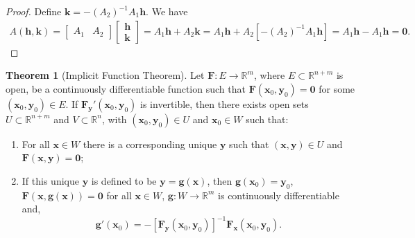 \documentclass{article}
\newcommand{\R}{\mathbb{R}}
\newcommand{\x}{\mathbf{x}}
\newcommand{\y}{\mathbf{y}}
\newcommand{\h}{\mathbf{h}}
\newcommand{\g}{\mathbf{g}}
\newcommand{\ze}{\mathbf{0}}
\theoremstyle{definition}
\newtheorem{theorem}{Theorem}[section]
\begin{document}
	\begin{proof}
		Define $ \mathbf k = -(A_2)^{-1}A_1 \h$. We have 
		\begin{align*}
			A(\h,\mathbf k) = \begin{bmatrix}A_1&A_2\end{bmatrix}\begin{bmatrix}
				\mathbf h\\ \mathbf k
			\end{bmatrix} = A_1\h + A_2\mathbf k = A_1\h + A_2[-(A_2)^{-1}A_1 \h] = A_1\h - A_1\h = \ze.
		\end{align*} 
	\end{proof}
	\begin{theorem}[Implicit Function Theorem]
		Let $ \mathbf F:E\to \R^{m} $, where $ E\subset  \R^{n+m}$ is open, be a continuously differentiable function such that $ \mathbf F(\x_0,\y_0) =\ze $ for some $ (\x_0,\y_0)\in E $. If $ \mathbf F_\y'(\x_0,\y_0) $ is invertible, then there exists open sets $ U\subset \R^{n+m} $ and $ V\subset \R^n $, with $ (\x_0,\y_0)\in U $ and $ \x_0\in W $ such that:
		\begin{enumerate}
			\item For all $ \x\in W $ there is a corresponding unique $ \y $ such that $ (\x,\y)\in U $ and $ \mathbf F(\x,\y) = \ze $;
			\item If this unique $ \y $ is defined to be $ \y = \mathbf g(\x) $, then $ \g(\x_0)=\y_0 $, $ \mathbf F(\x,\g(\x))=\ze $ for all $ \x\in W $,  $ \mathbf g:W\to\R^m $ is continuously differentiable and,
			$$ \g'(\x_0) = -[\mathbf F_\y(\x_0,\y_0)]^{-1}\mathbf F_\x(\x_0,\y_0).$$ 
		\end{enumerate} 
	\end{theorem}
\end{document}
